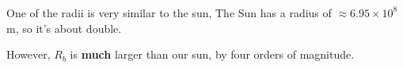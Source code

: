 \documentclass{article}
\begin{document}
\subsubsection{}
\begin{center}
    One of the radii is very similar to the sun,  The Sun has a radius of \(\approx 6.95 \times 10 ^8\)m, so it's about double. 

    However, \(R_b\) is \textbf{much} larger than our sun, by four orders of magnitude.

\end{center}

\subsection{}
\subsubsection{}
\end{document}
